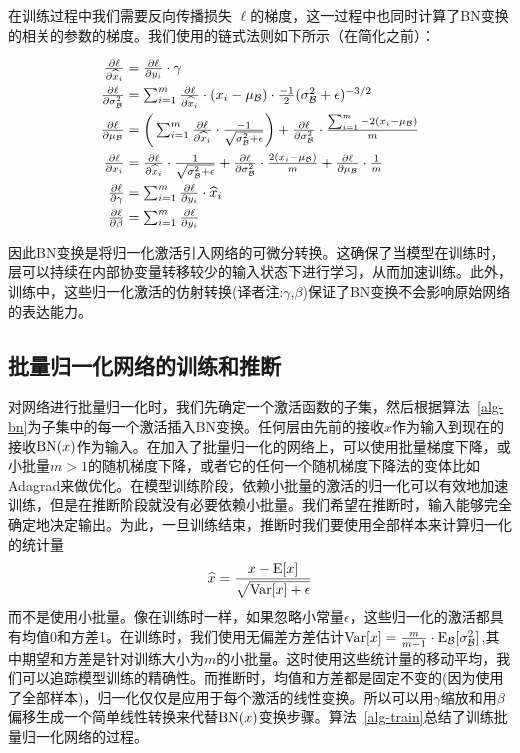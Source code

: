 \documentclass[twocolumn]{article}
\begin{document}
在训练过程中我们需要反向传播损失 $\ell$的梯度，这一过程中也同时计算了BN变换的相关的参数的梯度。我们使用的链式法则如下所示（在简化之前）： 

\begin{align*}
\textstyle\frac{\partial \ell}{\partial \widehat{x}_i} &\textstyle= \frac{\partial \ell}{\partial y_i}\cdot \gamma \\ 
\textstyle\frac{\partial \ell}{\partial \sigma_{\mathcal{B}}^2}
&\textstyle= \sum_{i=1}^m \frac{\partial \ell}{\partial \widehat{x}_i}\cdot(x_i-\mu_{\mathcal{B}})\cdot
\frac{-1}{2}(\sigma_{\mathcal{B}}^2+\epsilon)^{-3/2} \\ 
\textstyle\frac{\partial \ell}{\partial \mu_{\mathcal{B}}} &\textstyle=
\bigg(\sum_{i=1}^m \frac{\partial \ell}{\partial \widehat{x}_i}\cdot
\frac{-1}{\sqrt{\sigma_{\mathcal{B}}^2+\epsilon}}\bigg) +
\frac{\partial \ell}{\partial \sigma_{\mathcal{B}}^2}\cdot\frac{   \sum_{i=1}^m
  -2(x_i-\mu_{\mathcal{B}})}{m}\\
 \textstyle  \frac{\partial \ell}{\partial x_i} &\textstyle= \frac{\partial \ell}{\partial \widehat{x}_i} \cdot
\frac{1}{\sqrt{\sigma_{\mathcal{B}}^2+\epsilon}} + \frac{\partial \ell}{\partial \sigma_{\mathcal{B}}^2}\cdot
\frac{2(x_i-\mu_{\mathcal{B}})}{m} + \frac{\partial \ell}{\partial \mu_{\mathcal{B}}}\cdot \frac{1}{m}\\
\textstyle\frac{\partial \ell}{\partial \gamma}&\textstyle= \sum_{i=1}^m \frac{\partial \ell}{\partial y_i} \cdot \widehat{x}_i
  \\ 
\textstyle  \frac{\partial \ell}{\partial \beta} &\textstyle= \sum_{i=1}^m \frac{\partial \ell}{\partial y_i}
\end{align*}

因此BN变换是将归一化激活引入网络的可微分转换。这确保了当模型在训练时，层可以持续在内部协变量转移较少的输入状态下进行学习，从而加速训练。此外，训练中，这些归一化激活的仿射转换(译者注:$\gamma$,$\beta$)保证了BN变换不会影响原始网络的表达能力。

\subsection{批量归一化网络的训练和推断}
\label{sec-training}

对网络进行批量归一化时，我们先确定一个激活函数的子集，然后根据算法~\ref{alg-bn}为子集中的每一个激活插入BN变换。任何层由先前的接收$x$作为输入到现在的接收$\text{BN}(x)$作为输入。在加入了批量归一化的网络上，可以使用批量梯度下降，或小批量$m>1$的随机梯度下降，或者它的任何一个随机梯度下降法的变体比如Adagrad\cite{adagrad}来做优化。在模型训练阶段，依赖小批量的激活的归一化可以有效地加速训练，但是在推断阶段就没有必要依赖小批量。我们希望在推断时，输入能够完全确定地决定输出。为此，一旦训练结束，推断时我们要使用全部样本来计算归一化的统计量$$\widehat{x}=\frac{x-\text{E}[x]}{\sqrt{\text{Var}[x]+\epsilon}}$$而不是使用小批量。像在训练时一样，如果忽略小常量$\epsilon$，这些归一化的激活都具有均值0和方差1。在训练时，我们使用无偏差方差估计$\text{Var}[x] = \frac{m}{m-1}\cdot\text{E}_{\mathcal{B}}[\sigma_{\mathcal{B}}^2]$,其中期望和方差是针对训练大小为$m$的小批量。这时使用这些统计量的移动平均，我们可以追踪模型训练的精确性。而推断时，均值和方差都是固定不变的(因为使用了全部样本)，归一化仅仅是应用于每个激活的线性变换。所以可以用$\gamma$缩放和用$\beta$偏移生成一个简单线性转换来代替$\text{BN}(x)$变换步骤。算法~\ref{alg-train}总结了训练批量归一化网络的过程。
\end{document}
